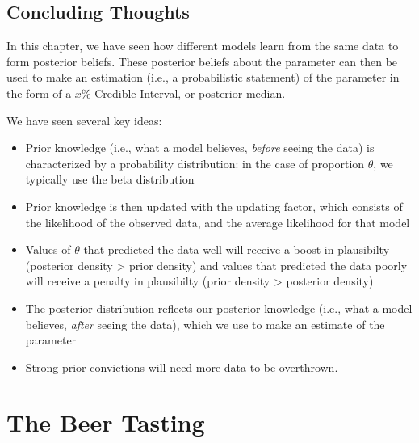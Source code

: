 \documentclass[
]{book}
\providecommand{\tightlist}{%
  \setlength{\itemsep}{0pt}\setlength{\parskip}{0pt}}
\begin{document}
\hypertarget{concluding-thoughts-1}{%
\section{Concluding Thoughts}\label{concluding-thoughts-1}}

In this chapter, we have seen how different models learn from the same data to form posterior beliefs. These posterior beliefs about the parameter can then be used to make an estimation (i.e., a probabilistic statement) of the parameter in the form of a \(x\%\) Credible Interval, or posterior median.

We have seen several key ideas:

\begin{itemize}
\tightlist
\item
  Prior knowledge (i.e., what a model believes, \emph{before} seeing the data) is characterized by a probability distribution: in the case of proportion \(\theta\), we typically use the beta distribution
\item
  Prior knowledge is then updated with the updating factor, which consists of the likelihood of the observed data, and the average likelihood for that model
\item
  Values of \(\theta\) that predicted the data well will receive a boost in plausibilty (posterior density \textgreater{} prior density) and values that predicted the data poorly will receive a penalty in plausibilty (prior density \textgreater{} posterior density)
\item
  The posterior distribution reflects our posterior knowledge (i.e., what a model believes, \emph{after} seeing the data), which we use to make an estimate of the parameter
\item
  Strong prior convictions will need more data to be overthrown.
\end{itemize}

\hypertarget{the-beer-tasting}{%
\chapter{The Beer Tasting}\label{the-beer-tasting}}
\end{document}

